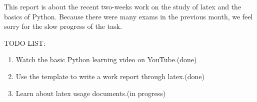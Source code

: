 \par
This report is about the recent two-weeks work on the study of latex and the basics of Python.
Because there were many exams in the previous month, we feel sorry for the slow progress of the task.


TODO LIST\@:
\begin{enumerate}
    \item Watch the basic Python learning video on YouTube.(done)
    \item Use the template to write a work report through latex.(done)
    \item Learn about latex usage documents.(in progress)
\end{enumerate}
